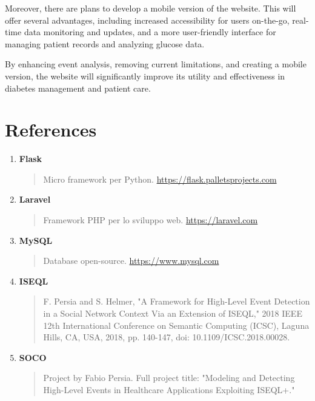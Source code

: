 \documentclass{article}
\begin{document}
Moreover, there are plans to develop a mobile version of the website. This will offer several advantages, including increased accessibility for users on-the-go, real-time data monitoring and updates, and a more user-friendly interface for managing patient records and analyzing glucose data.

By enhancing event analysis, removing current limitations, and creating a mobile version, the website will significantly improve its utility and effectiveness in diabetes management and patient care.

\pagebreak

\section*{References}

\begin{enumerate}

  \item \textbf{Flask}
    \begin{quote}
        Micro framework per Python. \url{https://flask.palletsprojects.com}
    \end{quote}
    
    \item \textbf{Laravel}
    \begin{quote}
        Framework PHP per lo sviluppo web. \url{https://laravel.com}
    \end{quote}

    \item \textbf{MySQL}
    \begin{quote}
        Database open-source. \url{https://www.mysql.com}
    \end{quote}

    \item \textbf{ISEQL}
    \begin{quote}
        F. Persia and S. Helmer, "A Framework for High-Level Event Detection in a Social Network Context Via an Extension of ISEQL," 2018 IEEE 12th International Conference on Semantic Computing (ICSC), Laguna Hills, CA, USA, 2018, pp. 140-147, doi: 10.1109/ICSC.2018.00028.
    \end{quote}
    
    \item \textbf{SOCO}
    \begin{quote}
        Project by Fabio Persia. Full project title: "Modeling and Detecting High-Level Events in Healthcare Applications Exploiting ISEQL+."
    \end{quote}
\end{enumerate}
    
\end{document}
